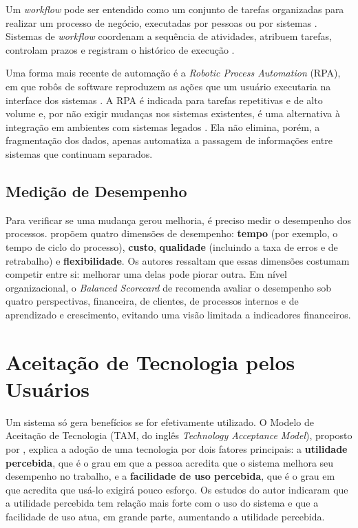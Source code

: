 Um \textit{workflow} pode ser entendido como um conjunto de tarefas organizadas para realizar um processo de negócio, executadas por pessoas ou por sistemas \citep{georgakopoulos1995}. Sistemas de \textit{workflow} coordenam a sequência de atividades, atribuem tarefas, controlam prazos e registram o histórico de execução \citep{vanderaalst2003}.

Uma forma mais recente de automação é a \textit{Robotic Process Automation} (RPA), em que robôs de software reproduzem as ações que um usuário executaria na interface dos sistemas \citep{vanderaalst2018}. A RPA é indicada para tarefas repetitivas e de alto volume e, por não exigir mudanças nos sistemas existentes, é uma alternativa à integração em ambientes com sistemas legados \citep{lacity2016,vanderaalst2018}. Ela não elimina, porém, a fragmentação dos dados, apenas automatiza a passagem de informações entre sistemas que continuam separados.

\subsection{Medição de Desempenho}

Para verificar se uma mudança gerou melhoria, é preciso medir o desempenho dos processos. \citet{dumas2018} propõem quatro dimensões de desempenho: \textbf{tempo} (por exemplo, o tempo de ciclo do processo), \textbf{custo}, \textbf{qualidade} (incluindo a taxa de erros e de retrabalho) e \textbf{flexibilidade}. Os autores ressaltam que essas dimensões costumam competir entre si: melhorar uma delas pode piorar outra. Em nível organizacional, o \textit{Balanced Scorecard} de \citet{kaplan1996} recomenda avaliar o desempenho sob quatro perspectivas, financeira, de clientes, de processos internos e de aprendizado e crescimento, evitando uma visão limitada a indicadores financeiros.

\section{Aceitação de Tecnologia pelos Usuários}
\label{sec:aceitacao}

Um sistema só gera benefícios se for efetivamente utilizado. O Modelo de Aceitação de Tecnologia (TAM, do inglês \textit{Technology Acceptance Model}), proposto por \citet{davis1989}, explica a adoção de uma tecnologia por dois fatores principais: a \textbf{utilidade percebida}, que é o grau em que a pessoa acredita que o sistema melhora seu desempenho no trabalho, e a \textbf{facilidade de uso percebida}, que é o grau em que acredita que usá-lo exigirá pouco esforço. Os estudos do autor indicaram que a utilidade percebida tem relação mais forte com o uso do sistema e que a facilidade de uso atua, em grande parte, aumentando a utilidade percebida.

